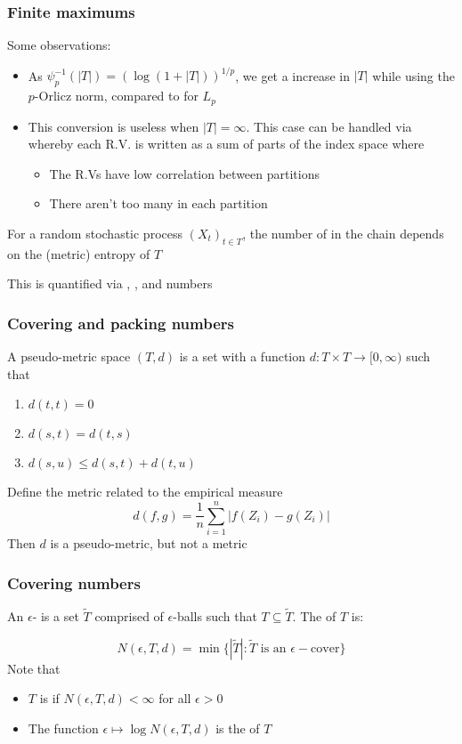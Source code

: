 \documentclass[12pt]{beamer}
\begin{document}
\begin{frame}[fragile]
\frametitle{Finite maximums}
Some observations:

\begin{itemize}

\item As $\psi_p^{-1}(|T|) = (\log(1+|T|))^{1/p}$, we get a  increase in $|T|$ while using the $p$-Orlicz norm,
compared to  for $L_p$

\item 
This conversion is useless when $|T| = \infty$.  This case can be handled via  whereby each R.V.
is written as a sum of parts of the index space where
\begin{itemize}
\item The R.Vs have low correlation between partitions
\item There aren't too many in each partition
\end{itemize}
\end{itemize}
For a random stochastic process $(X_t)_{t\in T}$, the number of  in the chain depends on the (metric) entropy
of $T$

\vsp
This is quantified via , , and  numbers
\end{frame}

\begin{frame}[fragile]
\frametitle{Covering and packing numbers}
A pseudo-metric space $(T,d)$ is a set with a function $d:T\times T \rightarrow [0,\infty)$ such that
\begin{enumerate}
\item $d(t,t) = 0$
\item $d(s,t) = d(t,s)$
\item $d(s,u) \leq d(s,t) + d(t,u)$
\end{enumerate} 
\vsp

 Define the metric related to the empirical measure
\[
d(f,g) = \frac{1}{n}\sum_{i=1}^n |f(Z_i) - g(Z_i)|
\]
Then $d$ is a pseudo-metric, but not a metric
\end{frame}


\begin{frame}[fragile]
\frametitle{Covering numbers}
An $\epsilon$- is a set $\tilde{T}$ comprised of $\epsilon$-balls such that $T \subseteq \tilde{T}$.
The  of $T$ is:

\[
N(\epsilon,T,d) = \min\{|\tilde{T}|: \tilde{T} \textrm{ is an } \epsilon-\textrm{cover}\}
\]
Note that 
\begin{itemize}
\item $T$ is  if $N(\epsilon,T,d) < \infty$ for all $\epsilon > 0$
\item The function $\epsilon \mapsto \log N(\epsilon,T,d)$ is the  of $T$
\end{itemize}
\end{frame}
\end{document}
